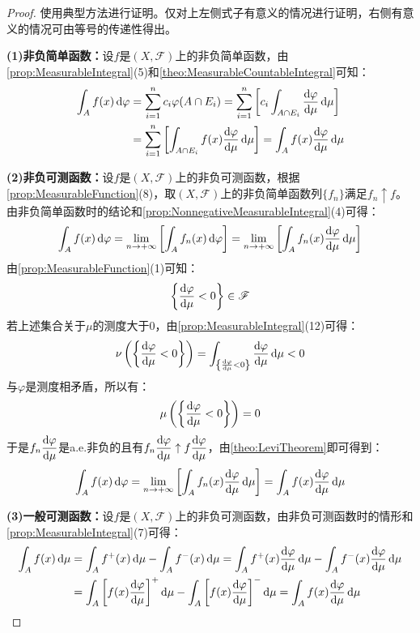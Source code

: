 \begin{proof}
	使用典型方法进行证明。仅对上左侧式子有意义的情况进行证明，右侧有意义的情况可由等号的传递性得出。\par
	\textbf{(1)非负简单函数：}设$f$是$(X,\mathscr{F})$上的非负简单函数，由\cref{prop:MeasurableIntegral}(5)和\cref{theo:MeasurableCountableIntegral}可知：
	\begin{align*}
		\int_{A}f(x)\dif\varphi&=\sum_{i=1}^{n}c_i\varphi(A\cap E_i)=\sum_{i=1}^{n}\left[c_i\int_{A\cap E_i}\frac{\dif\varphi}{\dif\mu}\dif\mu\right] \\
		&=\sum_{i=1}^{n}\left[\int_{A\cap E_i}f(x)\frac{\dif\varphi}{\dif\mu}\dif\mu\right]=\int_{A}f(x)\frac{\dif\varphi}{\dif\mu}\dif\mu
	\end{align*}\par
	\textbf{(2)非负可测函数：}设$f$是$(X,\mathscr{F})$上的非负可测函数，根据\cref{prop:MeasurableFunction}(8)，取$(X,\mathscr{F})$上的非负简单函数列$\{f_n\}$满足$f_n\uparrow f$。由非负简单函数时的结论和\cref{prop:NonnegativeMeasurableIntegral}(4)可得：
	\begin{equation*}
		\int_{A}f(x)\mathop{}\!\mathrm{d}\varphi=\lim_{n\to+\infty}\left[\int_{A}f_n(x)\mathop{}\!\mathrm{d}\varphi\right]=\lim_{n\to+\infty}\left[\int_{A}f_n(x)\frac{\mathop{}\!\mathrm{d}\varphi}{\mathop{}\!\mathrm{d}\mu}\mathop{}\!\mathrm{d}\mu\right]
	\end{equation*}
	由\cref{prop:MeasurableFunction}(1)可知：
	\begin{equation*}
		\left\{\frac{\mathop{}\!\mathrm{d}\varphi}{\mathop{}\!\mathrm{d}\mu}<0\right\}\in\mathscr{F}
	\end{equation*}
	若上述集合关于$\mu$的测度大于$0$，由\cref{prop:MeasurableIntegral}(12)可得：
	\begin{equation*}
		\nu\left(\left\{\frac{\mathop{}\!\mathrm{d}\varphi}{\mathop{}\!\mathrm{d}\mu}<0\right\}\right)=\int_{\left\{\frac{\mathop{}\!\mathrm{d}\varphi}{\mathop{}\!\mathrm{d}\mu}<0\right\}}\frac{\mathop{}\!\mathrm{d}\varphi}{\mathop{}\!\mathrm{d}\mu}\mathop{}\!\mathrm{d}\mu<0
	\end{equation*}
	与$\varphi$是测度相矛盾，所以有：
	\begin{equation*}
		\mu\left(\left\{\frac{\mathop{}\!\mathrm{d}\varphi}{\mathop{}\!\mathrm{d}\mu}<0\right\}\right)=0
	\end{equation*}
	于是$f_n\dfrac{\mathop{}\!\mathrm{d}\varphi}{\mathop{}\!\mathrm{d}\mu}$是a.e.非负的且有$f_n\dfrac{\mathop{}\!\mathrm{d}\varphi}{\mathop{}\!\mathrm{d}\mu}\uparrow f\dfrac{\mathop{}\!\mathrm{d}\varphi}{\mathop{}\!\mathrm{d}\mu}$，由\cref{theo:LeviTheorem}即可得到：
	\begin{equation*}
		\int_{A}f(x)\mathop{}\!\mathrm{d}\varphi=\lim_{n\to+\infty}\left[\int_{A}f_n(x)\frac{\mathop{}\!\mathrm{d}\varphi}{\mathop{}\!\mathrm{d}\mu}\mathop{}\!\mathrm{d}\mu\right]=\int_{A}f(x)\frac{\mathop{}\!\mathrm{d}\varphi}{\mathop{}\!\mathrm{d}\mu}\mathop{}\!\mathrm{d}\mu
	\end{equation*}\par
	\textbf{(3)一般可测函数：}设$f$是$(X,\mathscr{F})$上的非负可测函数，由非负可测函数时的情形和\cref{prop:MeasurableIntegral}(7)可得：
	\begin{align*}
		\int_{A}f(x)\dif\mu&=\int_{A}f^+(x)\dif\mu-\int_{A}f^-(x)\dif\mu=\int_{A}f^+(x)\frac{\dif\varphi}{\dif\mu}\dif\mu-\int_{A}f^-(x)\frac{\dif\varphi}{\dif\mu}\dif\mu \\
		&=\int_{A}\left[f(x)\frac{\dif\varphi}{\dif\mu}\right]^+\dif\mu-\int_{A}\left[f(x)\frac{\dif\varphi}{\dif\mu}\right]^-\dif\mu=\int_{A}f(x)\frac{\dif\varphi}{\dif\mu}\dif\mu\qedhere
	\end{align*}
\end{proof}
